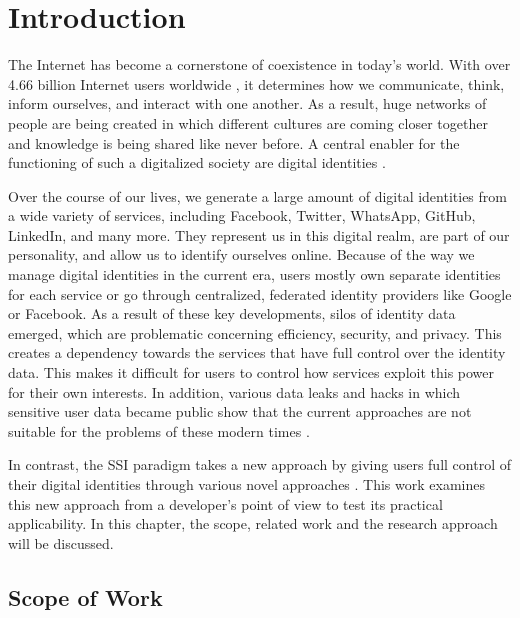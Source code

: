\chapter{Introduction}\label{chapter: Introduction}
	The Internet has become a cornerstone of coexistence in today's world. With over 4.66 billion Internet users worldwide \cite{johnson_internet_2021}, it determines how we communicate, think, inform ourselves, and interact with one another.	As a result, huge networks of people are being created in which different cultures are coming closer together and knowledge is being shared like never before. A central enabler for the functioning of such a digitalized society are digital identities \cite{liu_blockchain-based_2020}.
	
	Over the course of our lives, we generate a large amount of digital identities from a wide variety of services, including Facebook, Twitter, WhatsApp, GitHub, LinkedIn, and many more. They represent us in this digital realm, are part of our personality, and allow us to identify ourselves online. Because of the way we manage digital identities in the current era, users mostly own separate identities for each service or go through centralized, federated identity providers like Google or Facebook. As a result of these key developments, silos of identity data emerged, which are problematic concerning efficiency, security, and privacy. This creates a dependency towards the services that have full control over the identity data. This makes it difficult for users to control how services exploit this power for their own interests. In addition, various data leaks and hacks in which sensitive user data became public show that the current approaches are not suitable for the problems of these modern times \cite{swinhoe_15_2021}. \cite[pp. 2-3]{ehrlich_self-sovereign_2021}
	
	In contrast, the \ac{SSI} paradigm takes a new approach by giving users full control of their digital identities through various novel approaches \cite[p. 103059]{ferdous_search_2019}. This work examines this new approach from a developer's point of view to test its practical applicability. In this chapter, the scope, related work and the research approach will be discussed.
	
	\section{Scope of Work}\label{section: Scope of Work} %
	
